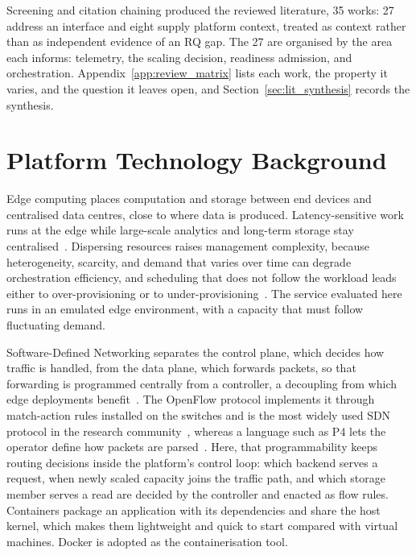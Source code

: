 ﻿\documentclass[12pt,reqno,twoside]{amsbook}
\begin{document}
Screening and citation chaining produced the reviewed literature, 35 works:
27 address an interface and eight supply platform context, treated as context
rather than as independent evidence of an RQ gap. The 27 are organised by the
area each informs: telemetry, the scaling decision, readiness admission,
and orchestration. Appendix~\ref{app:review_matrix} lists each work,
the property it varies, and the question it leaves open, and
Section~\ref{sec:lit_synthesis} records the synthesis.

\section{Platform Technology Background}\label{sec:platform_background} %
Edge computing places computation and storage between end devices and
centralised data centres, close to where data is produced. Latency-sensitive
work runs at the edge while large-scale analytics and long-term storage stay
centralised~\parencite{Cao2020OverviewEdgeComputingResearch,Satyanarayanan2017EmergenceEdgeComputing}.
Dispersing resources raises management complexity, because heterogeneity,
scarcity, and demand that varies over time can degrade orchestration efficiency,
and scheduling that does not follow the workload leads either to
over-provisioning or to
under-provisioning~\parencite{Liu2019SurveyEdgeComputingSystemsTools,Luo2021ResourceSchedulingEdgeComputingSurvey}.
The service evaluated here runs in an emulated edge environment, with a capacity
that must follow fluctuating demand.

Software-Defined Networking separates the control plane, which decides how
traffic is handled, from the data plane, which forwards packets, so that
forwarding is programmed centrally from a controller, a decoupling from which
edge deployments benefit~\parencite{Baktir2017HowCanEdgeComputingBenefit}. The
OpenFlow protocol implements it through match-action rules installed on the
switches and is the most widely used SDN protocol in the research
community~\parencite{Waseem2022SoftwareDefinedNetworkingSDNReview}, whereas a
language such as P4 lets the operator define how packets are
parsed~\parencite{Liatifis2023AdvancingSDNOpenFlowP4Survey}. Here, that
programmability keeps routing decisions inside the platform's control loop:
which backend serves a request, when newly scaled capacity joins the traffic
path, and which storage member serves a read are decided by the controller and
enacted as flow rules. Containers package an application with its dependencies
and share the host kernel, which makes them lightweight and quick to start
compared with virtual machines. Docker is adopted as the containerisation tool.
\end{document}
